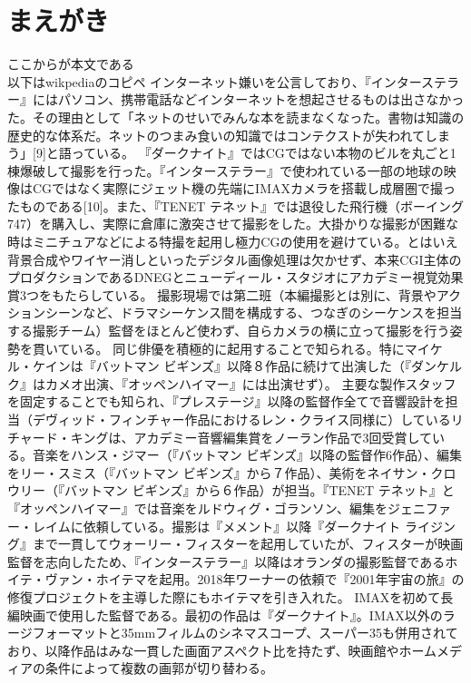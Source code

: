 \documentclass[paper]{ieicej}
\begin{document}
\section{まえがき}
ここからが本文である\\
以下はwikpediaのコピペ
インターネット嫌いを公言しており、『インターステラー』にはパソコン、携帯電話などインターネットを想起させるものは出さなかった。その理由として「ネットのせいでみんな本を読まなくなった。書物は知識の歴史的な体系だ。ネットのつまみ食いの知識ではコンテクストが失われてしまう」[9]と語っている。
『ダークナイト』ではCGではない本物のビルを丸ごと1棟爆破して撮影を行った。『インターステラー』で使われている一部の地球の映像はCGではなく実際にジェット機の先端にIMAXカメラを搭載し成層圏で撮ったものである[10]。また、『TENET テネット』では退役した飛行機（ボーイング747）を購入し、実際に倉庫に激突させて撮影をした。大掛かりな撮影が困難な時はミニチュアなどによる特撮を起用し極力CGの使用を避けている。とはいえ背景合成やワイヤー消しといったデジタル画像処理は欠かせず、本来CGI主体のプロダクションであるDNEGとニューディール・スタジオにアカデミー視覚効果賞3つをもたらしている。
撮影現場では第二班（本編撮影とは別に、背景やアクションシーンなど、ドラマシーケンス間を構成する、つなぎのシーケンスを担当する撮影チーム）監督をほとんど使わず、自らカメラの横に立って撮影を行う姿勢を貫いている。
同じ俳優を積極的に起用することで知られる。特にマイケル・ケインは『バットマン ビギンズ』以降８作品に続けて出演した（『ダンケルク』はカメオ出演、『オッペンハイマー』には出演せず）。
主要な製作スタッフを固定することでも知られ、『プレステージ』以降の監督作全てで音響設計を担当（デヴィッド・フィンチャー作品におけるレン・クライス同様に）しているリチャード・キングは、アカデミー音響編集賞をノーラン作品で3回受賞している。音楽をハンス・ジマー（『バットマン ビギンズ』以降の監督作6作品）、編集をリー・スミス（『バットマン ビギンズ』から７作品）、美術をネイサン・クロウリー（『バットマン ビギンズ』から６作品）が担当。『TENET テネット』と『オッペンハイマー』では音楽をルドウィグ・ゴランソン、編集をジェニファー・レイムに依頼している。撮影は『メメント』以降『ダークナイト ライジング』まで一貫してウォーリー・フィスターを起用していたが、フィスターが映画監督を志向したため、『インターステラー』以降はオランダの撮影監督であるホイテ・ヴァン・ホイテマを起用。2018年ワーナーの依頼で『2001年宇宙の旅』の修復プロジェクトを主導した際にもホイテマを引き入れた。
IMAXを初めて長編映画で使用した監督である。最初の作品は『ダークナイト』。IMAX以外のラージフォーマットと35mmフィルムのシネマスコープ、スーパー35も併用されており、以降作品はみな一貫した画面アスペクト比を持たず、映画館やホームメディアの条件によって複数の画郭が切り替わる。
\end{document}
